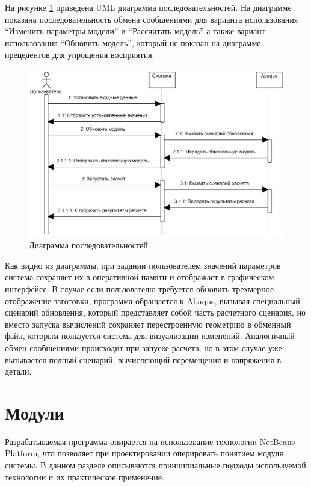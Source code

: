 \documentclass[14pt,oneside,final]{extreport}
\begin{document}
	На рисунке \ref{fig:seq-diagram} приведена UML диаграмма последовательностей. На диаграмме показана последовательность обмена сообщениями для варианта использования ``Изменить параметры модели'' и ``Рассчитать модель'' а также вариант использования ``Обновить модель'', который не показан на диаграмме прецедентов для упрощения восприятия.  

	\begin{figure}[!h]
		\begin{center}
			\includegraphics[scale=0.18]{img/sequence-diagram} 
		\end{center}
		\caption{Диаграмма последовательностей}
		\label{fig:seq-diagram}
	\end{figure}	
	
	Как видно из диаграммы, при задании пользователем значений параметров система сохраняет их в оперативной памяти и отображает в графическом интерфейсе. В случае если пользователю требуется обновить трехмерное отображение заготовки, программа обращается к Abaqus, вызывая специальный сценарий обновления, который представляет собой часть расчетного сценария, но вместо запуска вычислений сохраняет перестроенную геометрию в обменный файл, которым пользуется система для визуализации изменений. Аналогичный обмен сообщениями происходит при запуске расчета, но в этом случае уже вызывается полный сценарий, вычисляющий перемещения и напряжения в детали. 
	
	\section{Модули}
	Разрабатываемая программа опирается на использование технологии NetBeans Platform, что позволяет при проектировании оперировать понятием модуля системы. В данном разделе описываются принципиальные подходы используемой технологии и их практическое применение. 
\end{document}
